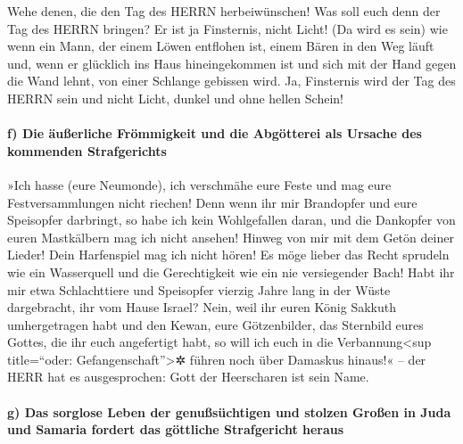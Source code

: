 Wehe denen, die den Tag des HERRN herbeiwünschen! Was
soll euch denn der Tag des HERRN bringen? Er ist ja Finsternis, nicht
Licht! (Da wird es sein) wie wenn ein Mann, der einem
Löwen entflohen ist, einem Bären in den Weg läuft und, wenn er glücklich
ins Haus hineingekommen ist und sich mit der Hand gegen die Wand lehnt,
von einer Schlange gebissen wird. Ja, Finsternis wird der
Tag des HERRN sein und nicht Licht, dunkel und ohne hellen Schein!

\hypertarget{f-die-uxe4uuxdferliche-fruxf6mmigkeit-und-die-abguxf6tterei-als-ursache-des-kommenden-strafgerichts}{%
\paragraph{f) Die äußerliche Frömmigkeit und die Abgötterei als Ursache
des kommenden
Strafgerichts}\label{f-die-uxe4uuxdferliche-fruxf6mmigkeit-und-die-abguxf6tterei-als-ursache-des-kommenden-strafgerichts}}

»Ich hasse (eure Neumonde), ich verschmähe eure Feste und
mag eure Festversammlungen nicht riechen! Denn wenn ihr
mir Brandopfer und eure Speisopfer darbringt, so habe ich kein
Wohlgefallen daran, und die Dankopfer von euren Mastkälbern mag ich
nicht ansehen! Hinweg von mir mit dem Getön deiner
Lieder! Dein Harfenspiel mag ich nicht hören! Es möge
lieber das Recht sprudeln wie ein Wasserquell und die Gerechtigkeit wie
ein nie versiegender Bach! Habt ihr mir etwa
Schlachttiere und Speisopfer vierzig Jahre lang in der Wüste
dargebracht, ihr vom Hause Israel? Nein, weil ihr euren
König Sakkuth umhergetragen habt und den Kewan, eure Götzenbilder, das
Sternbild eures Gottes, die ihr euch angefertigt habt, so
will ich euch in die Verbannung\textless sup title=``oder:
Gefangenschaft''\textgreater✲ führen noch über Damaskus hinaus!« -- der
HERR hat es ausgesprochen: Gott der Heerscharen ist sein Name.

\hypertarget{g-das-sorglose-leben-der-genuuxdfsuxfcchtigen-und-stolzen-grouxdfen-in-juda-und-samaria-fordert-das-guxf6ttliche-strafgericht-heraus}{%
\paragraph{g) Das sorglose Leben der genußsüchtigen und stolzen Großen
in Juda und Samaria fordert das göttliche Strafgericht
heraus}\label{g-das-sorglose-leben-der-genuuxdfsuxfcchtigen-und-stolzen-grouxdfen-in-juda-und-samaria-fordert-das-guxf6ttliche-strafgericht-heraus}}

